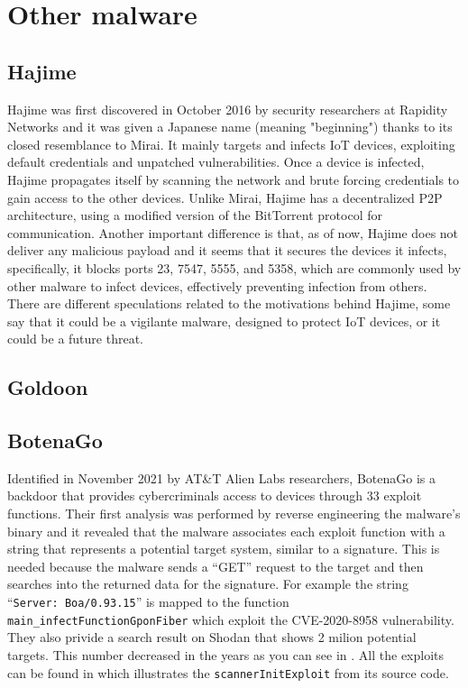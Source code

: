 \chapter{Other malware}

\section{Hajime}

Hajime was first discovered in October 2016 by security researchers at Rapidity Networks and it was given a Japanese name (meaning "beginning") thanks to its closed resemblance to Mirai. It mainly targets and infects IoT devices, exploiting default credentials and unpatched vulnerabilities. Once a device is infected, Hajime propagates itself by scanning the network and brute forcing credentials to gain access to the other devices. Unlike Mirai, Hajime has a decentralized P2P architecture, using a modified version of the BitTorrent protocol for communication. Another important difference is that, as of now, Hajime does not deliver any malicious payload and it seems that it secures the devices it infects, specifically, it blocks ports 23, 7547, 5555, and 5358, which are commonly used by other malware to infect devices, effectively preventing infection from others. There are different speculations related to the motivations behind Hajime, some say that it could be a vigilante malware, designed to protect IoT devices, or it could be a future threat.

\section{Goldoon}

\section{BotenaGo}

Identified in November 2021 by AT\&T Alien Labs researchers, BotenaGo is a backdoor that provides cybercriminals access to devices through 33 exploit functions. Their first analysis was performed by reverse engineering the malware's binary and it revealed that the malware associates each exploit function with a string that represents a potential target system, similar to a signature. This is needed because the malware sends a ``GET'' request to the target and then searches into the returned data for the signature. For example the string ``\texttt{Server: Boa/0.93.15}'' is mapped to the function \texttt{main\_infectFunctionGponFiber} which exploit the CVE-2020-8958 vulnerability. They also privide a search result on Shodan that shows 2 milion potential targets. This number decreased in the years as you can see in . All the exploits can be found in  which illustrates the \texttt{scannerInitExploit} from its source code.

